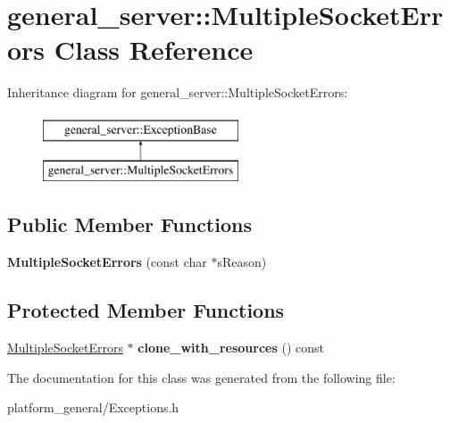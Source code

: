 \hypertarget{classgeneral__server_1_1MultipleSocketErrors}{\section{general\-\_\-server\-:\-:\-Multiple\-Socket\-Errors \-Class \-Reference}
\label{classgeneral__server_1_1MultipleSocketErrors}
}
\-Inheritance diagram for general\-\_\-server\-:\-:\-Multiple\-Socket\-Errors\-:\begin{figure}[H]
\begin{center}
\leavevmode
\includegraphics[height=2.000000cm]{classgeneral__server_1_1MultipleSocketErrors}
\end{center}
\end{figure}
\subsection*{\-Public \-Member \-Functions}
\begin{DoxyCompactItemize}
\item 
\hypertarget{classgeneral__server_1_1MultipleSocketErrors_a9f0117aec63562361cd237f43a8f71cc}{{\bfseries \-Multiple\-Socket\-Errors} (const char $\ast$s\-Reason)}\label{classgeneral__server_1_1MultipleSocketErrors_a9f0117aec63562361cd237f43a8f71cc}

\end{DoxyCompactItemize}
\subsection*{\-Protected \-Member \-Functions}
\begin{DoxyCompactItemize}
\item 
\hypertarget{classgeneral__server_1_1MultipleSocketErrors_a24abfb00836aab43fd3f2f6a176a54fc}{\hyperlink{classgeneral__server_1_1MultipleSocketErrors}{\-Multiple\-Socket\-Errors} $\ast$ {\bfseries clone\-\_\-with\-\_\-resources} () const }\label{classgeneral__server_1_1MultipleSocketErrors_a24abfb00836aab43fd3f2f6a176a54fc}

\end{DoxyCompactItemize}


\-The documentation for this class was generated from the following file\-:\begin{DoxyCompactItemize}
\item 
platform\-\_\-general/\-Exceptions.\-h\end{DoxyCompactItemize}
